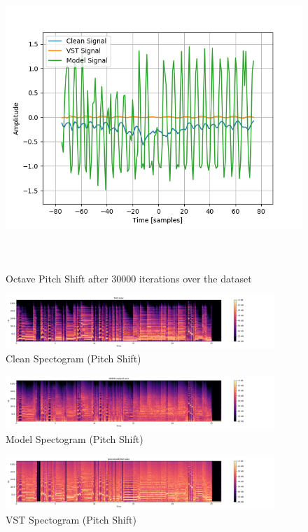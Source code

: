 \documentclass{l4proj}
\begin{document}
\begin{figure}
\centering
\includegraphics[width=6.00000in,height=4.50000in]{images/pitch.png}
\caption{Octave Pitch Shift after 30000 iterations over the
dataset\label{fig:pitch}}
\end{figure}

\begin{figure}
\centering
\includegraphics[width=4.00000in]{images/pitchclean.png}
\caption{Clean Spectogram (Pitch Shift)\label{fig:pitchc}}
\end{figure}

\begin{figure}
\centering
\includegraphics[width=4.00000in]{images/pitchmodel.png}
\caption{Model Spectogram (Pitch Shift)\label{fig:pitchm}}
\end{figure}

\begin{figure}
\centering
\includegraphics[width=4.00000in]{images/pitchvst.png}
\caption{VST Spectogram (Pitch Shift)\label{fig:pitchv}}
\end{figure}
\end{document}
